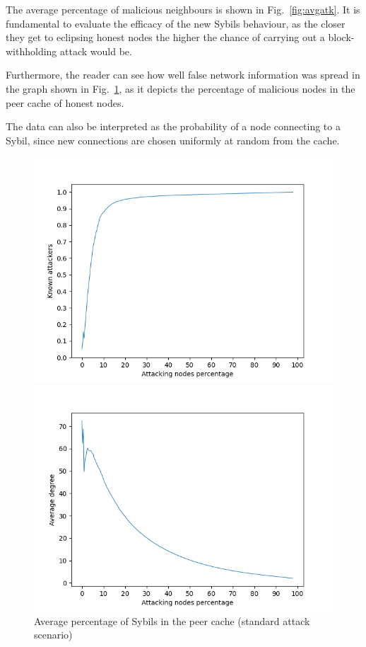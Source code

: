 The average percentage of malicious neighbours is shown in Fig.~\ref{fig:avgatk}. It is fundamental to evaluate the efficacy of the new Sybils behaviour, as the closer they get to eclipsing honest nodes the higher the chance of carrying out a block-withholding attack would be.\par

Furthermore, the reader can see how well false network information was spread in the graph shown in Fig.~\ref{fig:avgatk-known}, as it depicts the percentage of malicious nodes in the peer cache of honest nodes.

The data can also be interpreted as the probability of a node connecting to a Sybil, since new connections are chosen uniformly at random from the cache.\par

    \begin{figure}[ht]
        \begin{minipage}[b]{0.5\linewidth}
            \includegraphics[width=1.1\textwidth]{pict/results/in-hon-avg-known-atk.png}
			\centering
			\caption{Average percentage of Sybils in the peer cache (standard attack scenario)}
			\label{fig:avgatk-known}
        \end{minipage}
        \hspace{0.5cm}
        \begin{minipage}[b]{0.5\linewidth}
			\includegraphics[width=1.1\textwidth]{pict/results/in-atk-avg-degree.png}

\end{minipage}
\end{figure}
